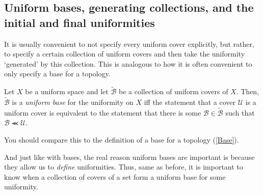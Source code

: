 \subsection{Uniform bases, generating collections, and the initial and final uniformities}

It is usually convenient to not specify every uniform cover explicitly, but rather, to specify a certain collection of uniform covers and then take the uniformity `generated' by this collection.  This is analogous to how it is often convenient to only specify a base for a topology.
\begin{dfn}\label{UniformBase}
Let $X$ be a uniform space and let $\widetilde{\mathcal{B}}$ be a collection of uniform covers of $X$.  Then, $\widetilde{\mathcal{B}}$ is a \emph{uniform base} for the uniformity on $X$ iff the statement that a cover $\mathcal{U}$ is a uniform cover is equivalent to the statement that there is some $\mathcal{B}\in \widetilde{\mathcal{B}}$ such that $\mathcal{B}\llcurly \mathcal{U}$.
\begin{rmk}
You should compare this to the definition of a base for a topology (\cref{Base}).
\end{rmk}
\end{dfn}
And just like with bases, the real reason uniform bases are important is because they allow us to \emph{define} uniformities.  Thus, same as before, it is important to know when a collection of covers of a set form a uniform base for some uniformity.
